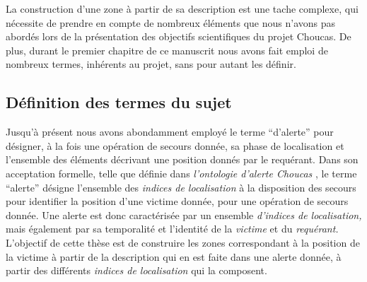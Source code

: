 La construction d'une zone à partir de sa description est une tache
complexe, qui nécessite de prendre en compte de nombreux éléments que
nous n'avons pas abordés lors de la présentation des objectifs
scientifiques du projet Choucas. De plus, durant le premier chapitre
de ce manuscrit nous avons fait emploi de nombreux termes, inhérents
au projet, sans pour autant les définir.

\subsection{Définition des termes du sujet}
\label{subsec:2-1}

Jusqu'à présent nous avons abondamment employé le terme
\enquote{d'alerte} pour désigner, à la fois une opération de secours
donnée, sa phase de localisation et l'ensemble des éléments décrivant
une position donnés par le requérant. Dans son acceptation formelle,
\ie telle que définie dans \emph{l’ontologie d'alerte Choucas}
\autocite[\ac{oac},][]{Viry2019}, le terme \enquote{alerte} désigne
l'ensemble des \emph{indices de localisation} à la disposition des
secours pour identifier la position d'une victime donnée, pour une
opération de secours donnée. Une alerte est donc caractérisée par un
ensemble \emph{d'indices de localisation,} mais également par sa
temporalité et l'identité de la \emph{victime} et du \emph{requérant.}
L'objectif de cette thèse est de construire les zones correspondant à
la position de la victime à partir de la description qui en est faite
dans une alerte donnée, \ie à partir des différents \emph{indices de
  localisation} qui la composent.

